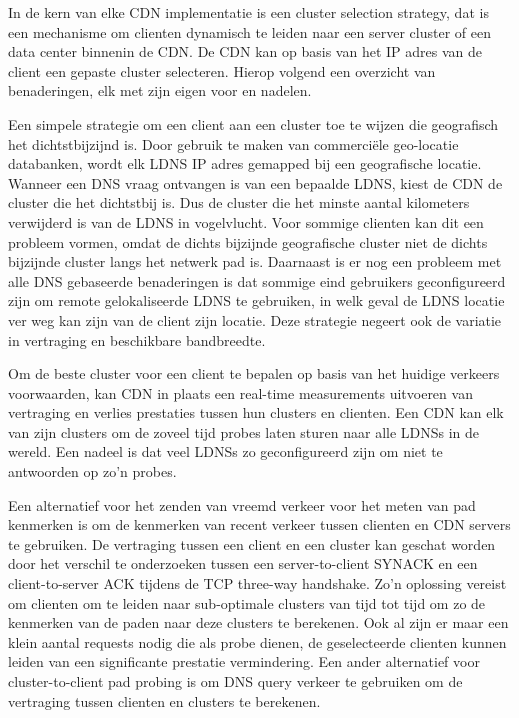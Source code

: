 
\noindent In de kern van elke CDN implementatie is een cluster selection strategy, dat is een mechanisme om clienten dynamisch te leiden naar een server cluster of een data center binnenin de CDN. De CDN kan op basis van het IP adres van de client een gepaste cluster selecteren.
Hierop volgend een overzicht van benaderingen, elk met zijn eigen voor en nadelen.

\noindent Een simpele strategie om een client aan een cluster toe te wijzen die geografisch het dichtstbijzijnd is. Door gebruik te maken van commerciële geo-locatie databanken, wordt elk LDNS IP adres gemapped bij een geografische locatie. Wanneer een DNS vraag ontvangen is van een bepaalde LDNS, kiest de CDN de cluster die het dichtstbij is. Dus de cluster die het minste aantal kilometers verwijderd is van de LDNS in vogelvlucht.
Voor sommige clienten kan dit een probleem vormen, omdat de dichts bijzijnde geografische cluster niet de dichts bijzijnde cluster langs het netwerk pad is. Daarnaast is er nog een probleem met alle DNS gebaseerde benaderingen is dat sommige eind gebruikers geconfigureerd zijn om remote gelokaliseerde LDNS te gebruiken, in welk geval de LDNS locatie ver weg kan zijn van de client zijn locatie. Deze strategie negeert ook de variatie in vertraging en beschikbare bandbreedte.

\noindent Om de beste cluster voor een client te bepalen op basis van het huidige verkeers voorwaarden, kan CDN in plaats een real-time measurements uitvoeren van vertraging en verlies prestaties tussen hun clusters en clienten. Een CDN kan elk van zijn clusters om de zoveel tijd probes laten sturen naar alle LDNSs in de wereld. Een nadeel is dat veel LDNSs zo geconfigureerd zijn om niet te antwoorden op zo’n probes.

\noindent Een alternatief voor het zenden van vreemd verkeer voor het meten van pad kenmerken is om de kenmerken van recent verkeer tussen clienten en CDN servers te gebruiken. De vertraging tussen een client en een cluster kan geschat worden door het verschil te onderzoeken tussen een server-to-client SYNACK en een client-to-server ACK tijdens de TCP three-way handshake. Zo’n oplossing vereist om clienten om te leiden naar sub-optimale clusters van tijd tot tijd om zo de kenmerken van de paden naar deze clusters te berekenen. Ook al zijn er maar een klein aantal requests nodig die als probe dienen, de geselecteerde clienten kunnen leiden van een significante prestatie vermindering.
Een ander alternatief voor cluster-to-client pad probing is om DNS query verkeer te gebruiken om de vertraging tussen clienten en clusters te berekenen.

